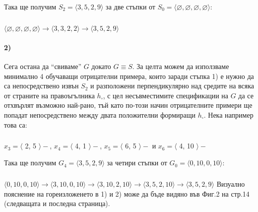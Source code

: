 \documentclass[12pt]{article}
\begin{document}
	\paragraph{}
	Така ще получим $S_{2} = \langle 3, 5, 2, 9 \rangle$ за две стъпки от $S_{0} = \langle \varnothing,\varnothing,\varnothing,\varnothing \rangle$:
		\subparagraph{}
		$\langle \varnothing,\varnothing,\varnothing,\varnothing \rangle \rightarrow \langle 3,3,2,2 \rangle \rightarrow \langle 3,5,2,9 \rangle$
	
	\paragraph{2)}
	Сега остана да ``свиваме'' $G$ докато $G \equiv S$.\newline\newline
	За целта можем да използваме минимално 4 обучаващи отрицателни примера, които заради стъпка 1) е нужно да са непосредствено извън $S_{2}$ и разположени перпендикулярно над средите на всяка от страните на правоъгълника $h_{\square}$, с цел несъвместимите спецификации на $G$ да се отхвърлят възможно най-рано, тъй като по-този начин отрицателните примери ще попадат непосредствено между двата положителни формиращи $h_{\square}$. Нека например това са:
		\subparagraph{}
		$x_{3} = \langle $ 2, 5 $\rangle  -$, $x_{4} = \langle $ 4, 1 $\rangle  -$, $x_{5} = \langle $ 6, 5 $\rangle  -$ и $x_{6} = \langle $ 4, 10 $\rangle  -$\newline\newline
		
	
	Така ще получим $G_{4} = \langle 3, 5, 2, 9 \rangle$ за четири стъпки от $G_{0} = \langle 0,10,0,10 \rangle$:
		\subparagraph{}
		$\langle 0,10,0,10\rangle \rightarrow \langle 3,10,0,10 \rangle \rightarrow \langle 3,10,2,10 \rangle \rightarrow \langle 3,5,2,10 \rangle \rightarrow \langle 3,5,2,9 \rangle$
	\newline\newline\newline
	Визуално пояснение на гореизложенето в 1) и 2) може да бъде видяно във Фиг.2 на стр.14 (следващата и последна страница).
\end{document}
